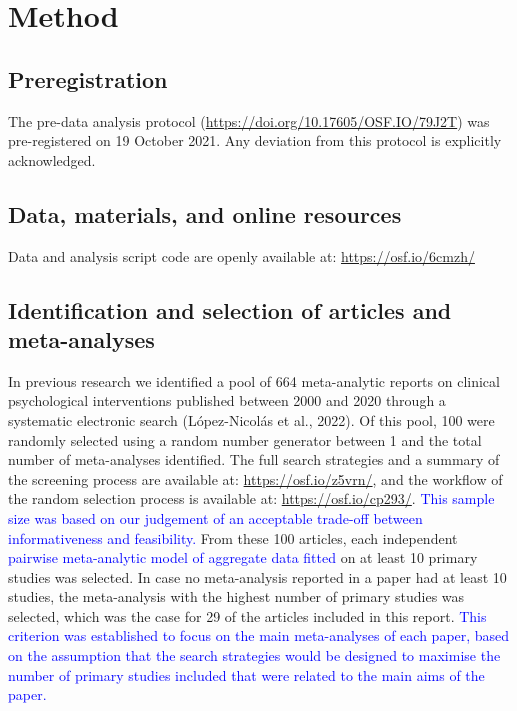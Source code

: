 \documentclass[
  ,man,floatsintext]{apa6}
\begin{document}
\hypertarget{method}{%
\section{Method}\label{method}}

\hypertarget{preregistration}{%
\subsection{Preregistration}\label{preregistration}}

The pre-data analysis protocol (\url{https://doi.org/10.17605/OSF.IO/79J2T}) was pre-registered on 19 October 2021. Any deviation from this protocol is explicitly acknowledged.

\hypertarget{data-materials-and-online-resources}{%
\subsection{Data, materials, and online resources}\label{data-materials-and-online-resources}}

Data and analysis script code are openly available at: \url{https://osf.io/6cmzh/}

\hypertarget{identification-and-selection-of-articles-and-meta-analyses}{%
\subsection{Identification and selection of articles and meta-analyses}\label{identification-and-selection-of-articles-and-meta-analyses}}

In previous research we identified a pool of 664 meta-analytic reports on clinical psychological interventions published between 2000 and 2020 through a systematic electronic search (López-Nicolás et al., 2022). Of this pool, 100 were randomly selected using a random number generator between 1 and the total number of meta-analyses identified. The full search strategies and a summary of the screening process are available at: \url{https://osf.io/z5vrn/}, and the workflow of the random selection process is available at: \url{https://osf.io/cp293/}. \textcolor{blue}{This sample size was based on our judgement of an acceptable trade-off between informativeness and feasibility.}
From these 100 articles, each independent \textcolor{blue} {pairwise meta-analytic model of aggregate data fitted} on at least 10 primary studies was selected. In case no meta-analysis reported in a paper had at least 10 studies, the meta-analysis with the highest number of primary studies was selected, which was the case for 29 of the articles included in this report. \textcolor{blue}{This criterion was established to focus on the main meta-analyses of each paper, based on the assumption that the search strategies would be designed to maximise the number of primary studies included that were related to the main aims of the paper.}
\end{document}
